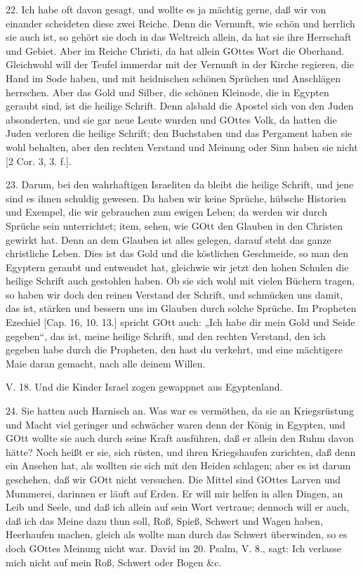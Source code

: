 22. Ich habe oft davon gesagt, und wollte es ja mächtig gerne, daß wir von einander scheideten diese zwei Reiche. Denn die Vernunft, wie schön und herrlich sie auch ist, so gehört sie doch in das Weltreich allein, da hat sie ihre Herrschaft und Gebiet. Aber im Reiche Christi, da hat allein GOttes Wort die Oberhand. Gleichwohl will der Teufel immerdar mit der Vernunft in der Kirche regieren, die Hand im Sode haben, und mit heidnischen schönen Sprüchen und Anschlägen herrschen. Aber das Gold und Silber, die schönen Kleinode, die in Egypten geraubt sind, ist die heilige Schrift. Denn alsbald die Apostel sich von den Juden absonderten, und sie gar neue Leute wurden und GOttes Volk, da hatten die Juden verloren die heilige Schrift; den Buchstaben und das Pergament haben sie wohl behalten, aber den rechten Verstand und Meinung oder Sinn haben sie nicht [2 Cor. 3, 3. f.].

23. Darum, bei den wahrhaftigen Israeliten da bleibt die heilige Schrift, und jene sind es ihnen schuldig gewesen. Da haben wir keine Sprüche, hübsche Historien und Exempel, die wir gebrauchen zum ewigen Leben; da werden
wir durch Sprüche sein unterrichtet; item, sehen, wie GOtt den Glauben in den Christen gewirkt hat. Denn an dem Glauben ist alles gelegen, darauf steht das ganze christliche Leben. Dies ist das Gold und die köstlichen Geschmeide, so man den Egyptern geraubt und entwendet hat, gleichwie wir jetzt den hohen Schulen die heilige Schrift auch gestohlen haben. Ob sie sich wohl mit vielen Büchern tragen, so haben wir doch den reinen Verstand der Schrift, und schmücken uns damit, das ist, stärken und bessern uns im Glauben durch solche Sprüche. Im Propheten Ezechiel [Cap. 16, 10. 13.] spricht GOtt auch: „Ich habe dir mein Gold und Seide gegeben“, das ist, meine heilige Schrift, und den rechten Verstand, den ich gegeben habe durch die Propheten, den hast du verkehrt, und eine mächtigere Maie daran gemacht, nach alle deinem Willen.

\begin{schriftzitat}
V. 18. Und die Kinder Israel zogen gewappnet aus Egyptenland.
\end{schriftzitat}

24. Sie hatten auch Harnisch an. Was war es vermöthen, da sie an Kriegsrüstung und Macht viel geringer und schwächer waren denn der König in Egypten, und GOtt wollte sie auch durch seine Kraft ausführen, daß er allein den Ruhm davon hätte? Noch heißt er sie, sich rüsten, und ihren Kriegshaufen zurichten, daß denn ein Ansehen hat, als wollten sie sich mit den Heiden schlagen; aber es ist darum geschehen, daß wir GOtt nicht versuchen. Die Mittel sind GOttes Larven und Mummerei, darinnen er läuft auf Erden. Er will mir helfen in allen Dingen, an Leib und Seele, und daß ich allein auf sein Wort vertraue; dennoch will er auch, daß ich das Meine dazu thun soll, Roß, Spieß, Schwert und Wagen haben, Heerhaufen machen, gleich als wollte man durch das Schwert überwinden, so es doch GOttes Meinung nicht war. David im 20. Psalm, V. 8., sagt: Ich verlasse mich nicht auf mein Roß, Schwert oder Bogen \&c.

